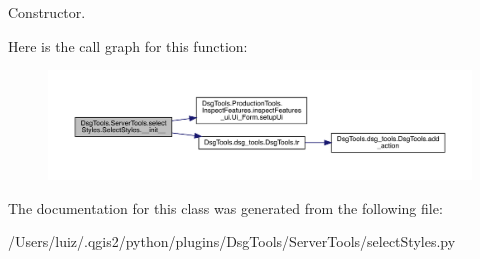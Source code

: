 \begin{DoxyVerb}Constructor.\end{DoxyVerb}
 Here is the call graph for this function\+:
\nopagebreak
\begin{figure}[H]
\begin{center}
\leavevmode
\includegraphics[width=350pt]{class_dsg_tools_1_1_server_tools_1_1select_styles_1_1_select_styles_aa1a95bdbcd33b3491a1758b4cdbd6611_cgraph}
\end{center}
\end{figure}


The documentation for this class was generated from the following file\+:\begin{DoxyCompactItemize}
\item 
/\+Users/luiz/.\+qgis2/python/plugins/\+Dsg\+Tools/\+Server\+Tools/select\+Styles.\+py\end{DoxyCompactItemize}
